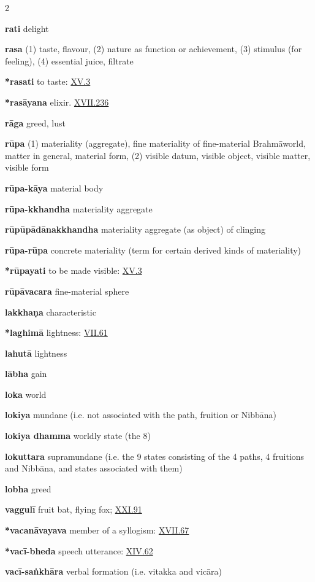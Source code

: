 \begin{multicols}{2}
\begin{vismHanging}
\par\textbf{rati} delight
\par\textbf{rasa} (1) taste, flavour, (2) nature as function or achievement, (3) stimulus (for feeling), (4) essential juice, filtrate 
\par\textbf{*rasati} to taste: \hyperlink{XV.3}{XV.3}{}
\par\textbf{*rasāyana} elixir. \hyperlink{XVII.236}{XVII.236}{}
\par\textbf{rāga} greed, lust
\par\textbf{rūpa} (1) materiality (aggregate), fine materiality of fine-material Brahmāworld, matter in general, material form, (2) visible datum, visible object, visible matter, visible form 
\par\textbf{rūpa-kāya} material body
\par\textbf{rūpa-kkhandha} materiality aggregate
\par\textbf{rūpūpādānakkhandha} materiality aggregate (as object) of clinging 
\par\textbf{rūpa-rūpa} concrete materiality (term for certain derived kinds of materiality) 
\par\textbf{*rūpayati} to be made visible: \hyperlink{XV.3}{XV.3}{}
\par\textbf{rūpāvacara} fine-material sphere
\par\textbf{lakkhaṇa} characteristic
\par\textbf{*laghimā} lightness: \hyperlink{VII.61}{VII.61}{}
\par\textbf{lahutā} lightness
\par\textbf{lābha} gain
\par\textbf{loka} world
\par\textbf{lokiya} mundane (i.e. not associated with the path, fruition or Nibbāna) 
\par\textbf{lokiya dhamma} worldly state (the 8)
\par\textbf{lokuttara} supramundane (i.e. the 9 states consisting of the 4 paths, 4 fruitions and Nibbāna, and states associated with them) 
\par\textbf{lobha} greed
\par\textbf{vaggulī} fruit bat, flying fox; \hyperlink{XXI.91}{XXI.91}{}
\par\textbf{*vacanāvayava} member of a syllogism: \hyperlink{XVII.67}{XVII.67}{} 
\par\textbf{*vacī-bheda} speech utterance: \hyperlink{XIV.62}{XIV.62}{}
\par\textbf{vacī-saṅkhāra} verbal formation (i.e. vitakka and vicāra) 

\end{vismHanging}
\end{multicols}
